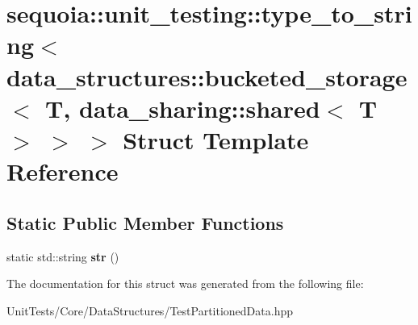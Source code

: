 \hypertarget{structsequoia_1_1unit__testing_1_1type__to__string_3_01data__structures_1_1bucketed__storage_3_07094e4cad0d31dc2d7fd097ffd32a3f2}{}\section{sequoia\+::unit\+\_\+testing\+::type\+\_\+to\+\_\+string$<$ data\+\_\+structures\+::bucketed\+\_\+storage$<$ T, data\+\_\+sharing\+::shared$<$ T $>$ $>$ $>$ Struct Template Reference}
\label{structsequoia_1_1unit__testing_1_1type__to__string_3_01data__structures_1_1bucketed__storage_3_07094e4cad0d31dc2d7fd097ffd32a3f2}
\subsection*{Static Public Member Functions}
\begin{DoxyCompactItemize}
\item 
\mbox{\label{structsequoia_1_1unit__testing_1_1type__to__string_3_01data__structures_1_1bucketed__storage_3_07094e4cad0d31dc2d7fd097ffd32a3f2_a69c78773a83cefb0e9969bc4fc22deb6}} 
static std\+::string {\bfseries str} ()
\end{DoxyCompactItemize}


The documentation for this struct was generated from the following file\+:\begin{DoxyCompactItemize}
\item 
Unit\+Tests/\+Core/\+Data\+Structures/Test\+Partitioned\+Data.\+hpp\end{DoxyCompactItemize}
